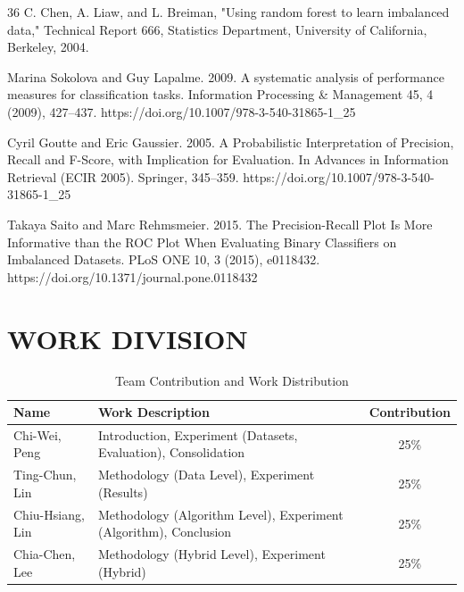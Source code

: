 \documentclass[sigconf]{acmart}
\begin{document}
\begin{thebibliography}{36}
 C. Chen, A. Liaw, and L. Breiman, "Using random forest to learn imbalanced data," Technical Report 666, Statistics Department, University of California, Berkeley, 2004.

 Marina Sokolova and Guy Lapalme. 2009. A systematic analysis of performance measures for classification tasks. Information Processing \& Management 45, 4 (2009), 427–437. https://doi.org/10.1007/978-3-540-31865-1\_25

 Cyril Goutte and Eric Gaussier. 2005. A Probabilistic Interpretation of Precision, Recall and F-Score, with Implication for Evaluation. In Advances in Information Retrieval (ECIR 2005). Springer, 345–359. https://doi.org/10.1007/978-3-540-31865-1\_25

 Takaya Saito and Marc Rehmsmeier. 2015. The Precision-Recall Plot Is More Informative than the ROC Plot When Evaluating Binary Classifiers on Imbalanced Datasets. PLoS ONE 10, 3 (2015), e0118432. https://doi.org/10.1371/journal.pone.0118432

\end{thebibliography}

\section{WORK DIVISION}

\begin{table}[htbp]
    \centering
    \renewcommand{\arraystretch}{1.2} 
    
    \begin{tabular}{p{3cm} p{8.5cm} c}
        \toprule
        \textbf{Name} & \textbf{Work Description} & \textbf{Contribution} \\
        \midrule
        Chi-Wei, Peng & Introduction, Experiment (Datasets, Evaluation), Consolidation & 25\% \\
        Ting-Chun, Lin & Methodology (Data Level), Experiment (Results) & 25\% \\
        Chiu-Hsiang, Lin & Methodology (Algorithm Level), Experiment (Algorithm), Conclusion & 25\% \\
        Chia-Chen, Lee & Methodology (Hybrid Level), Experiment (Hybrid) & 25\% \\
        \bottomrule
    \end{tabular}
    
    \caption{Team Contribution and Work Distribution}
    \label{tab:contribution}
\end{table}
\end{document}
